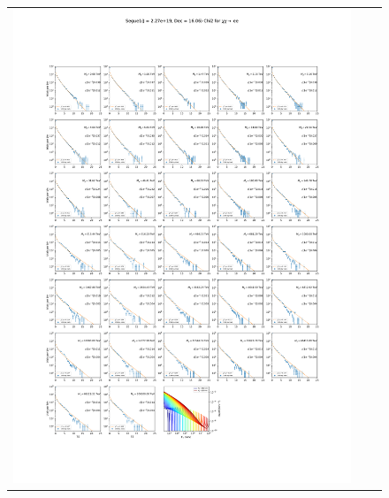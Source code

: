 \begin{figure}[!hb]
{\begin{tabular}{ccc}
            \includegraphics[clip, trim=22.1cm 6.5cm 19.5cm 56.5cm, scale=0.55]{figures/ic_DM/dm_plots/Segue1_ee_chi2_Masspanel_2024-04-28.pdf} &

\end{tabular}}
\end{figure}

